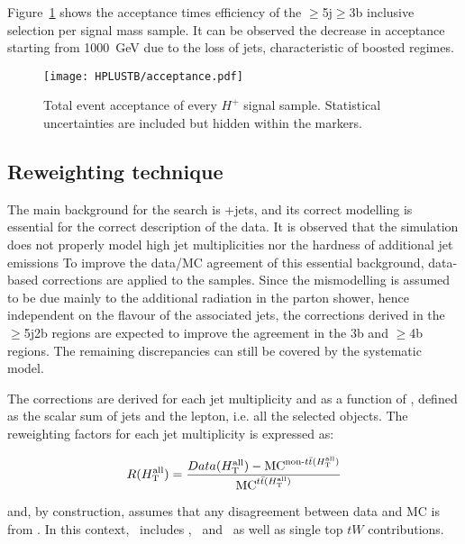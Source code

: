 Figure~\ref{Hplustb:acceptance} shows the acceptance times efficiency of the $\geq$5j$\geq$3b inclusive selection per signal mass sample. It can be observed the decrease in acceptance starting from 1000~GeV due to the loss of jets, characteristic of boosted regimes.

\begin{figure}[htbp]
    \RawFloats
    \begin{center}
    \texttt{[image: HPLUSTB/acceptance.pdf]}
    \caption{
        Total event acceptance of every $H^+$ signal sample. Statistical uncertainties are included but hidden within the markers.
    }
    \label{Hplustb:acceptance}
    \end{center}
\end{figure}

\clearpage
\subsection{Reweighting technique}
\label{Hplustb:secRW}
The main background for the search is \ttbar+jets, and its correct modelling is essential for the correct description of the data. It is observed that the simulation does not properly model high jet multiplicities nor the hardness of additional jet emissions %
To improve the data/MC agreement of this essential background, data-based corrections are applied to the \ttbar samples. Since the mismodelling is assumed to be due mainly to the additional radiation in the parton shower, hence independent on the flavour of the associated jets, the corrections derived in the $\geq$5j2b regions are expected to improve the agreement in the 3b and $\geq$4b regions. The remaining discrepancies can still be covered by the systematic model.

The corrections are derived for each jet multiplicity and as a function of \HTall, defined as the scalar \pT sum of jets and the lepton, i.e. all the selected objects. The reweighting factors for each jet multiplicity is expressed as:

\begin{equation}
    \label{Hplustb:RWeq}
    R(H_{\text{T}}^{\text{all}})=\frac{ Data(H_{\text{T}}^{\text{all}}) - \text{MC}^{\text{non-\ensuremath{t\bar{t}}}(H_{\text{T}}^{\text{all}})} }{\text{MC}^{\text{\ensuremath{t\bar{t}}}(H_{\text{T}}^{\text{all}})}}
\end{equation}

and, by construction, assumes that any disagreement between data and MC is from \ttbar. In this context, \ttbar\ includes \ttb, \ttc\ and \ttl\ as well as single top $tW$ contributions. 

